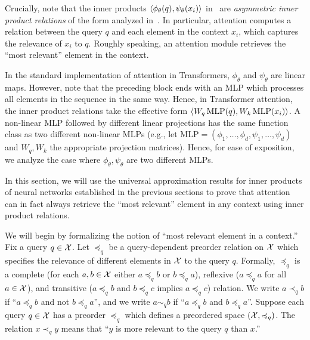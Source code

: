 Crucially, note that the inner products $\left \langle \phi_\theta(q), \psi_\theta(x_i) \right\rangle$ in~ are \textit{asymmetric inner product relations} of the form analyzed in~. In particular, attention computes a relation between the query $q$ and each element in the context $x_i$, which captures the relevance of $x_i$ to $q$. Roughly speaking, an attention module retrieves the ``most relevant'' element in the context.

\begin{remark}
    In the standard implementation of attention in Transformers, $\phi_\theta$ and $\psi_\theta$ are linear maps. However, note that the preceding block ends with an MLP which processes all elements in the sequence in the same way. Hence, in Transformer attention, the inner product relations take the effective form $\langle W_q \, \mathrm{MLP}(q), W_k \, \mathrm{MLP}(x_i) \rangle$. A non-linear MLP followed by different linear projections has the same function class as two different non-linear MLPs (e.g., let $\mathrm{MLP} = (\phi_1, \ldots, \phi_d, \psi_1, \ldots, \psi_d)$ and $W_q, W_k$ the appropriate projection matrices). Hence, for ease of exposition, we analyze the case where $\phi_\theta, \psi_\theta$ are two different MLPs.
\end{remark}

In this section, we will use the universal approximation results for inner products of neural networks established in the previous sections to prove that attention can in fact always retrieve the ``most relevant'' element in any context using inner product relations.

We will begin by formalizing the notion of ``most relevant element in a context.'' Fix a query $q \in {\mathcal{X}}$. Let $\preceq_q$ be a query-dependent preorder relation on ${\mathcal{X}}$ which specifies the relevance of different elements in ${\mathcal{X}}$ to the query $q$. Formally, $\preceq_q$ is a complete (for each $a,b \in {\mathcal{X}}$ either $a \preceq_q b$ or $b \preceq_q a$), reflexive ($a \preceq_q a$ for all $a \in {\mathcal{X}}$), and transitive ($a \preceq_q b$ and $b \preceq_q c$ implies $a \preceq_q c$) relation.  We write $a \prec_q b$ if ``$a \preceq_q b$ and not $b \preceq_q a$'', and we write $a \sim_q b$ if ``$a \preceq_q b$ and $b \preceq_q a$''. Suppose each query $q \in {\mathcal{X}}$ has a preorder $\preceq_q$ which defines a preordered space $({\mathcal{X}}, \preccurlyeq_q)$. The relation $x \prec_q y$ means that ``$y$ is more relevant to the query $q$ than $x$.''

